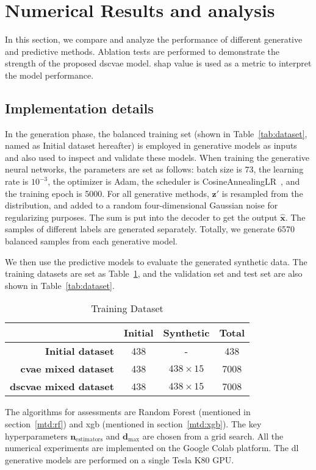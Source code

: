 \documentclass[twoside,twocolumn,9pt]{article}
\begin{document}
\section{Numerical Results and analysis}\label{NumericalResults}
In this section, we compare and analyze the performance of different generative and predictive methods. Ablation tests are performed to demonstrate the strength of the proposed \acrshort*{dscvae} model. \acrshort*{shap} value is used as a metric to interpret the model performance.
\subsection{Implementation details} 
In the generation phase, the balanced training set (shown in Table~\ref{tab:dataset}, named as Initial dataset hereafter) is employed in generative models as inputs and also used to inspect and validate these models. When training the generative neural networks, the parameters are set as follows: batch size is 73, the learning rate is $10^{-3}$, the optimizer is Adam, the scheduler is CosineAnnealingLR~\cite{loshchilov2016sgdr}, and the training epoch is 5000. For all generative methods, $\mathbf{z'}$ is resampled from the distribution, and added to a random four-dimensional Gaussian noise for regularizing purposes. The sum is put into the decoder to get the output $\mathbf{\hat{x}}$. The samples of different labels are generated separately. Totally, we generate 6570 balanced samples from each generative model. 

We then use the predictive models to evaluate the generated synthetic data. The training datasets are set as Table~\ref{tab:training}, and the validation set and test set are also shown in Table~\ref{tab:dataset}. 

\begin{table}[!htb]
\centering
\caption{Training Dataset}
\begin{tabular}{rccc}
\hline
\multicolumn{1}{l}{} & Initial & Synthetic & Total \\ \hline
\textbf{Initial dataset} & 438 & - & 438 \\
\textbf{\acrshort*{cvae} mixed dataset} & 438 & $438\times15$ & 7008 \\
\textbf{\acrshort*{dscvae} mixed dataset} & 438 & $438\times15$ & 7008 \\ \hline
\end{tabular}
\label{tab:training}
\end{table}

The algorithms for assessments are Random Forest (mentioned in section~\ref{mtd:rf}) and \acrlong*{xgb} (mentioned in section~\ref{mtd:xgb}). The key hyperparameters $\mathbf{n}_\textrm{estimators}$ and $\mathbf{d}_\textrm{max}$ are chosen from a grid search.
All the numerical experiments are implemented on the Google Colab platform. The \acrshort*{dl} generative models are performed on a single Tesla K80 GPU. 
\end{document}
